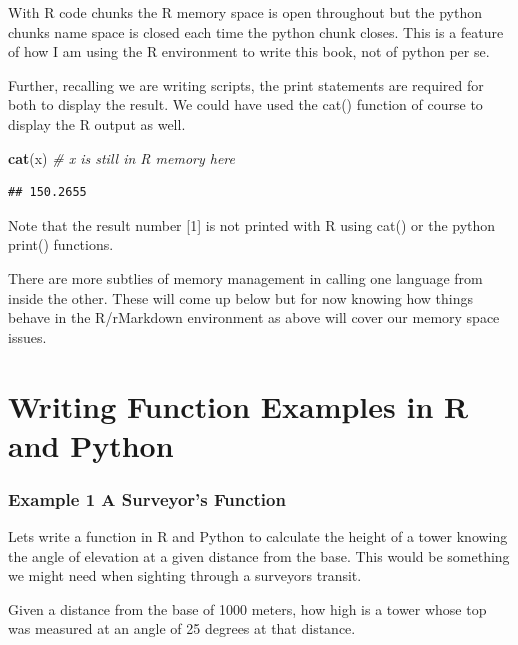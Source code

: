 \documentclass[]{book}
\newenvironment{Shaded}{\begin{snugshade}}{\end{snugshade}}
\newcommand{\KeywordTok}[1]{\textcolor[rgb]{0.13,0.29,0.53}{\textbf{#1}}}
\newcommand{\CommentTok}[1]{\textcolor[rgb]{0.56,0.35,0.01}{\textit{#1}}}
\newcommand{\NormalTok}[1]{#1}
\theoremstyle{definition}
\theoremstyle{definition}
\theoremstyle{definition}
\theoremstyle{remark}
\begin{document}
With R code chunks the R memory space is open throughout but the python
chunks name space is closed each time the python chunk closes. This is a
feature of how I am using the R environment to write this book, not of
python per se.

Further, recalling we are writing scripts, the print statements are
required for both to display the result. We could have used the cat()
function of course to display the R output as well.

\begin{Shaded}
\begin{Highlighting}[]
\KeywordTok{cat}\NormalTok{(x)       }\CommentTok{# x is still in R memory here}
\end{Highlighting}
\end{Shaded}

\begin{verbatim}
## 150.2655
\end{verbatim}

Note that the result number {[}1{]} is not printed with R using cat() or
the python print() functions.

There are more subtlies of memory management in calling one language
from inside the other. These will come up below but for now knowing how
things behave in the R/rMarkdown environment as above will cover our
memory space issues.

\section{Writing Function Examples in R and
Python}\label{writing-function-examples-in-r-and-python}

\subsubsection{Example 1 A Surveyor's
Function}\label{example-1-a-surveyors-function}

Lets write a function in R and Python to calculate the height of a tower
knowing the angle of elevation at a given distance from the base. This
would be something we might need when sighting through a surveyors
transit.

Given a distance from the base of 1000 meters, how high is a tower whose
top was measured at an angle of 25 degrees at that distance.
\end{document}
